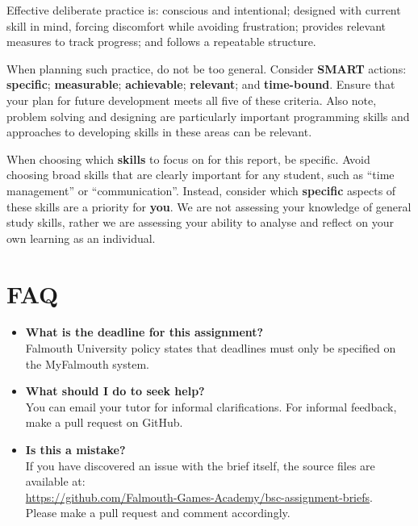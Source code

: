 \documentclass{../../fal_assignment}
\begin{document}
Effective deliberate practice is: conscious and intentional; designed with current skill in mind, forcing discomfort while avoiding frustration; provides relevant measures to track progress; and follows a repeatable structure.

When planning such practice, do not be too general. Consider \textbf{SMART} actions: \textbf{specific}; \textbf{measurable}; \textbf{achievable}; \textbf{relevant}; and \textbf{time-bound}. Ensure that your plan for future development meets all five of these criteria. Also note, problem solving and designing are particularly important programming skills and approaches to developing skills in these areas can be relevant.

When choosing which \textbf{skills} to focus on for this report, be specific. Avoid choosing broad skills that are clearly important for any student, such as ``time management'' or ``communication''. Instead, consider which \textbf{specific} aspects of these skills are a priority for \textbf{you}. We are not assessing your knowledge of general study skills, rather we are assessing your ability to analyse and reflect on your own learning as an individual.

\section*{FAQ}

\begin{itemize}
	\item 	\textbf{What is the deadline for this assignment?} \\ 
    		Falmouth University policy states that deadlines must only be specified on the MyFalmouth system.
    			    		    		
	\item 	\textbf{What should I do to seek help?} \\ 
    		You can email your tutor for informal clarifications. For informal feedback, make a pull request on GitHub. 
    		
    	\item 	\textbf{Is this a mistake?} \\ 	
    		If you have discovered an issue with the brief itself, the source files are available at: \\
    		\url{https://github.com/Falmouth-Games-Academy/bsc-assignment-briefs}.\\
    		 Please make a pull request and comment accordingly.
\end{itemize}
\end{document}
